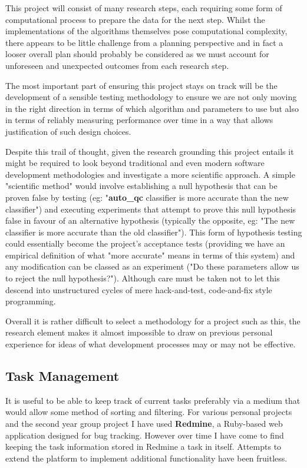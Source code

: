 This project will consist of many research steps, each requiring some form of
computational process to prepare the data for the next step. Whilst the
implementations of the algorithms themselves pose computational complexity,
there appears to be little challenge from a planning perspective and in fact a
looser overall plan should probably be considered as we must account for
unforeseen and unexpected outcomes from each research step.

The most important part of ensuring this project stays on track will be the
development of a sensible testing methodology to ensure we are not only moving
in the right direction in terms of which algorithm and parameters to use but
also in terms of reliably measuring performance over time in a way that allows
justification of such design choices.

Despite this trail of thought, given the research grounding this project entails
it might be required to look beyond traditional and even modern software
development methodologies and investigate a more scientific approach. A simple
"scientific method" would involve establishing a null hypothesis that can be
proven false by testing (eg: "\textbf{auto\_qc} classifier is more
accurate than the new classifier") and executing experiments that
attempt to prove this null hypothesis false in favour of an alternative
hypothesis (typically the opposite, eg: "The new classifier is more
accurate than the old classifier"). This form of hypothesis testing
could essentially become the project's acceptance tests (providing we have an
empirical definition of what "more accurate" means in terms of this
system) and any modification can be classed as an experiment ("Do these
parameters allow us to reject the null hypothesis?").  Although care must be
taken not to let this descend into unstructured cycles of mere hack-and-test,
code-and-fix style programming.

Overall it is rather difficult to select a methodology for a project such as
this, the research element makes it almost impossible to draw on previous
personal experience for ideas of what development processes may or may not be
effective.


\subsection{Task Management}

It is useful to be able to keep track of current tasks preferably via a medium
that would allow some method of sorting and filtering. For various personal
projects and the second year group project I have used \textbf{Redmine}, a
Ruby-based web application designed for bug tracking. However over time I have
come to find keeping the task information stored in Redmine a task in itself.
Attempts to extend the platform to implement additional functionality have been
fruitless.

